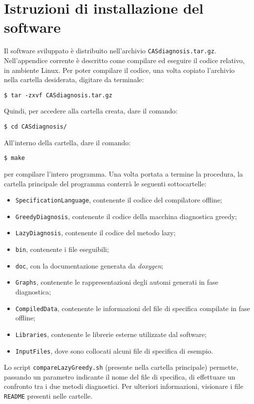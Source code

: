 \chapter{Istruzioni di installazione del software}
Il software sviluppato è distribuito nell'archivio \verb|CASdiagnosis.tar.gz|. Nell'appendice corrente è descritto come compilare ed eseguire il codice relativo, in ambiente Linux.
Per poter compilare il codice, una volta copiato l'archivio nella cartella desiderata, digitare da terminale:

\begin{verbatim}
$ tar -zxvf CASdiagnosis.tar.gz
\end{verbatim}

Quindi, per accedere alla cartella creata, dare il comando:

\begin{verbatim}
$ cd CASdiagnosis/
\end{verbatim}

All'interno della cartella, dare il comando:

\begin{verbatim}
$ make
\end{verbatim}

per compilare l'intero programma.
Una volta portata a termine la procedura, la cartella principale del programma conterrà le seguenti sottocartelle:
\begin{itemize}
\item \verb|SpecificationLanguage|, contenente il codice del compilatore offline;
\item \verb|GreedyDiagnosis|, contenente il codice della macchina diagnostica greedy;
\item \verb|LazyDiagnosis|, contenente il codice del metodo lazy;
\item \verb|bin|, contenente i file eseguibili;
\item \verb|doc|, con la documentazione generata da \emph{doxygen};
\item \verb|Graphs|, contenente le rappresentazioni degli automi generati in fase diagnostica;
\item \verb|CompiledData|, contenente le informazioni del file di specifica compilate in fase offline;
\item \verb|Libraries|, contenente le librerie esterne utilizzate dal software;
\item \verb|InputFiles|, dove sono collocati alcuni file di specifica di esempio.
\end{itemize}
Lo script \verb|compareLazyGreedy.sh| (presente nella cartella principale) permette, passando un parametro indicante il nome del file di specifica, di effettuare un confronto tra i due metodi diagnostici.
Per ulteriori informazioni, visionare i file \verb|README| presenti nelle cartelle.